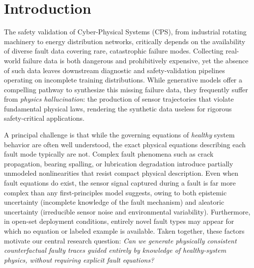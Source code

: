 \documentclass[conference]{IEEEtran}
\begin{document}
\section{Introduction}
\label{sec:intro}

The safety validation of Cyber-Physical Systems (CPS), from industrial rotating machinery to energy distribution networks, critically depends on the availability of diverse fault data covering rare, catastrophic failure modes. Collecting real-world failure data is both dangerous and prohibitively expensive, yet the absence of such data leaves downstream diagnostic and safety-validation pipelines operating on incomplete training distributions. %
While generative models offer a compelling pathway to synthesize this missing failure data, they frequently suffer from \emph{physics hallucination}: the production of sensor trajectories that violate fundamental physical laws, rendering the synthetic data useless for rigorous safety-critical applications. %

A principal challenge is that while the governing equations of \emph{healthy} system behavior are often well understood, the exact physical equations describing each fault mode typically are not. Complex fault phenomena such as crack propagation, bearing spalling, or lubrication degradation introduce partially unmodeled nonlinearities that resist compact physical description. Even when fault equations do exist, the sensor signal captured during a fault is far more complex than any first-principles model suggests, owing to both epistemic uncertainty (incomplete knowledge of the fault mechanism) and aleatoric uncertainty (irreducible sensor noise and environmental variability). Furthermore, in open-set deployment conditions, entirely novel fault types may appear for which no equation or labeled example is available. Taken together, these factors motivate our central research question: \emph{Can we generate physically consistent counterfactual faulty traces guided entirely by knowledge of healthy-system physics, without requiring explicit fault equations?}

\end{document}
